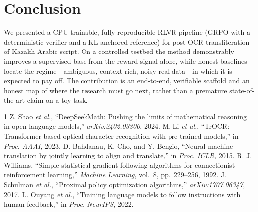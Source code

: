 \documentclass[conference]{IEEEtran}
\begin{document}
\section{Conclusion}
We presented a CPU-trainable, fully reproducible RLVR pipeline (GRPO with a
deterministic verifier and a KL-anchored reference) for post-OCR transliteration
of Kazakh Arabic script. On a controlled testbed the method demonstrably improves
a supervised base from the reward signal alone, while honest baselines locate the
regime---ambiguous, context-rich, noisy real data---in which it is expected to
pay off. The contribution is an end-to-end, verifiable scaffold and an honest map
of where the research must go next, rather than a premature state-of-the-art
claim on a toy task.

\begin{thebibliography}{1}
 Z. Shao \emph{et al.}, ``DeepSeekMath: Pushing the limits
of mathematical reasoning in open language models,'' \emph{arXiv:2402.03300},
2024.
 M. Li \emph{et al.}, ``TrOCR: Transformer-based optical character
recognition with pre-trained models,'' in \emph{Proc. AAAI}, 2023.
 D. Bahdanau, K. Cho, and Y. Bengio, ``Neural machine
translation by jointly learning to align and translate,'' in \emph{Proc. ICLR},
2015.
 R. J. Williams, ``Simple statistical gradient-following
algorithms for connectionist reinforcement learning,'' \emph{Machine Learning},
vol.~8, pp.~229--256, 1992.
 J. Schulman \emph{et al.}, ``Proximal policy optimization
algorithms,'' \emph{arXiv:1707.06347}, 2017.
 L. Ouyang \emph{et al.}, ``Training language models to
follow instructions with human feedback,'' in \emph{Proc. NeurIPS}, 2022.
\end{thebibliography}
\end{document}
